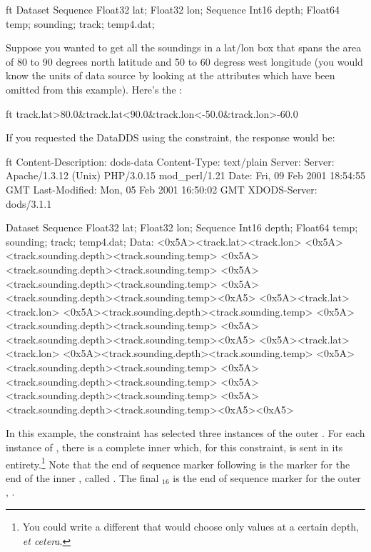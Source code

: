 \documentclass[justify]{nasa-ese}
\begin{document}
\begin{vcode}{ft}
Dataset {
  Sequence {
    Float32 lat;
    Float32 lon;
    Sequence {
      Int16 depth;
      Float64 temp;
    } sounding;
  } track;
} temp4.dat;
\end{vcode}

Suppose you wanted to get all the soundings in a lat/lon box that spans the
area of 80 to 90 degrees north latitude and 50 to 60 degress west longitude
(you would know the units of data source by looking at the attributes which
have been omitted from this example). Here's the \CE:

\begin{vcode}{ft}
track.lat>80.0&track.lat<90.0&track.lon<-50.0&track.lon>-60.0
\end{vcode}
\label{ex-last}
If you requested the DataDDS using the constraint, the response would be:

\begin{vcode}{ft}
Content-Description: dods-data
Content-Type: text/plain
Server: Server: Apache/1.3.12 (Unix)  PHP/3.0.15 mod_perl/1.21
Date: Fri, 09 Feb 2001 18:54:55 GMT
Last-Modified: Mon, 05 Feb 2001 16:50:02 GMT
XDODS-Server: dods/3.1.1

Dataset {
  Sequence {
    Float32 lat;
    Float32 lon;
    Sequence {
      Int16 depth;
      Float64 temp;
    } sounding;
  } track;
} temp4.dat;
Data:
<0x5A><track.lat><track.lon>
<0x5A><track.sounding.depth><track.sounding.temp>
<0x5A><track.sounding.depth><track.sounding.temp>
<0x5A><track.sounding.depth><track.sounding.temp>
<0x5A><track.sounding.depth><track.sounding.temp><0xA5>
<0x5A><track.lat><track.lon>
<0x5A><track.sounding.depth><track.sounding.temp>
<0x5A><track.sounding.depth><track.sounding.temp>
<0x5A><track.sounding.depth><track.sounding.temp><0xA5>
<0x5A><track.lat><track.lon>
<0x5A><track.sounding.depth><track.sounding.temp>
<0x5A><track.sounding.depth><track.sounding.temp>
<0x5A><track.sounding.depth><track.sounding.temp>
<0x5A><track.sounding.depth><track.sounding.temp>
<0x5A><track.sounding.depth><track.sounding.temp><0xA5><0xA5>
\end{vcode}

In this example, the constraint has selected three instances of the outer
\Sequence {}. For each instance of , there is a complete
inner \Sequence {} which, for this constraint, is sent in its
entirety.\footnote{You could write a different \CE that would choose only
values at a certain depth, {\it et cetera}.} Note that the end of sequence
marker following  is the marker for the end of the
inner \Sequence, called . The final $_{16}$ is the end
of sequence marker for the outer \Sequence, .
\end{document}
